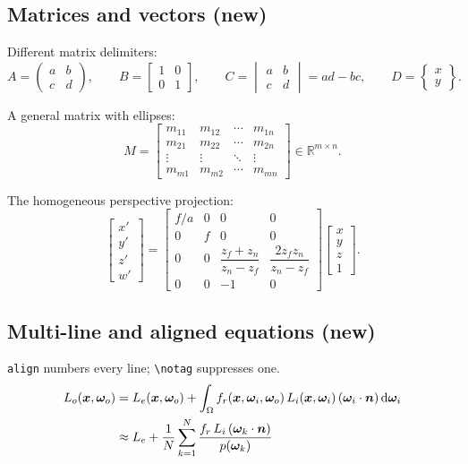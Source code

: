 \documentclass[11pt,a4paper]{article}
\newcommand{\R}{\mathbb{R}}                       %
\theoremstyle{plain}
\theoremstyle{definition}
\theoremstyle{remark}
\begin{document}
\subsection{Matrices and vectors (new)}
Different matrix delimiters:
\[
A = \begin{pmatrix} a & b \\ c & d \end{pmatrix},\qquad
B = \begin{bmatrix} 1 & 0 \\ 0 & 1 \end{bmatrix},\qquad
C = \begin{vmatrix} a & b \\ c & d \end{vmatrix} = ad - bc,\qquad
D = \begin{Bmatrix} x \\ y \end{Bmatrix}.
\]

A general matrix with ellipses:
\[
M =
\begin{bmatrix}
m_{11} & m_{12} & \cdots & m_{1n} \\
m_{21} & m_{22} & \cdots & m_{2n} \\
\vdots & \vdots & \ddots & \vdots \\
m_{m1} & m_{m2} & \cdots & m_{mn}
\end{bmatrix}
\in \R^{m \times n}.
\]

The homogeneous perspective projection:
\[
\begin{bmatrix} x' \\ y' \\ z' \\ w' \end{bmatrix}
=
\begin{bmatrix}
f/a & 0 & 0 & 0 \\
0 & f & 0 & 0 \\
0 & 0 & \dfrac{z_f+z_n}{z_n-z_f} & \dfrac{2 z_f z_n}{z_n-z_f} \\
0 & 0 & -1 & 0
\end{bmatrix}
\begin{bmatrix} x \\ y \\ z \\ 1 \end{bmatrix}.
\]

\subsection{Multi-line and aligned equations (new)}
\verb|align| numbers every line; \verb|\notag| suppresses one.
\begin{align}
    L_o(\bm{x}, \bm{\omega}_o)
      &= L_e(\bm{x}, \bm{\omega}_o)
       + \int_{\Omega} f_r(\bm{x}, \bm{\omega}_i, \bm{\omega}_o)\,
         L_i(\bm{x}, \bm{\omega}_i)\,(\bm{\omega}_i \cdot \bm{n})\,
         \mathrm{d}\bm{\omega}_i \label{eq:rendering} \\
      &\approx L_e + \frac{1}{N}\sum_{k=1}^{N}
         \frac{f_r\, L_i\, (\bm{\omega}_k \cdot \bm{n})}{p(\bm{\omega}_k)} \notag
\end{align}
\end{document}
